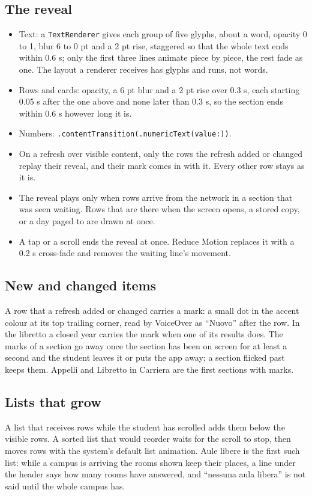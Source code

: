 \subsection{The reveal}
\begin{itemize}
  \item Text: a \texttt{TextRenderer} gives each group of five glyphs, about a word, opacity 0 to 1, blur 6 to 0 pt and a 2 pt rise, staggered so that the whole text ends within 0.6 s; only the first three lines animate piece by piece, the rest fade as one. The layout a renderer receives has glyphs and runs, not words.
  \item Rows and cards: opacity, a 6 pt blur and a 2 pt rise over 0.3 s, each starting 0.05 s after the one above and none later than 0.3 s, so the section ends within 0.6 s however long it is.
  \item Numbers: \texttt{.contentTransition(.numericText(value:))}.
  \item On a refresh over visible content, only the rows the refresh added or changed replay their reveal, and their mark comes in with it. Every other row stays as it is.
  \item The reveal plays only when rows arrive from the network in a section that was seen waiting. Rows that are there when the screen opens, a stored copy, or a day paged to are drawn at once.
  \item A tap or a scroll ends the reveal at once. Reduce Motion replaces it with a 0.2 s cross-fade and removes the waiting line's movement.
\end{itemize}

\subsection{New and changed items}
A row that a refresh added or changed carries a mark: a small dot in the accent
colour at its top trailing corner, read by VoiceOver as ``Nuovo'' after the row.
In the libretto a closed year carries the mark when one of its results does. The
marks of a section go away once the section has been on screen for at least a
second and the student leaves it or puts the app away; a section flicked past
keeps them. Appelli and Libretto in Carriera are the first sections with marks.

\subsection{Lists that grow}
A list that receives rows while the student has scrolled adds them below the
visible rows. A sorted list that would reorder waits for the scroll to stop, then
moves rows with the system's default list animation. Aule libere is the first such
list: while a campus is arriving the rooms shown keep their places, a line under
the header says how many rooms have answered, and ``nessuna aula libera'' is not
said until the whole campus has.

